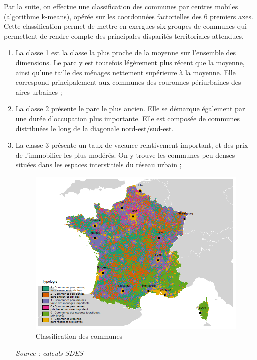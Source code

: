\documentclass[12pt, a4paper]{article}
\begin{document}
Par la suite, on effectue une classification des communes par centres mobiles (algorithme k-means), opérée sur les coordonnées factorielles des 6 premiers axes. Cette classification permet de mettre en exergues six groupes de communes qui permettent de rendre compte des principales disparités territoriales attendues. 
\begin{enumerate}
\item La classe 1 est la classe la plus proche de la moyenne sur l'ensemble des dimensions. Le parc y est toutefois légèrement plus récent que la moyenne, ainsi qu'une taille des ménages nettement supérieure à la moyenne. Elle correspond principalement aux communes des couronnes périurbaines des aires urbaines ;
\item La classe 2 présente le parc le plus ancien. Elle se démarque également par une durée d'occupation plus importante. Elle est composée de communes distribuées le long de la diagonale nord-est/sud-est.
\item La classe 3 présente un taux de vacance relativement important, et des prix de l'immobilier les plus modérés. On y trouve les communes peu denses situées dans les espaces interstitiels du réseau urbain ;

\begin{figure}[H]
\caption{Classification des communes}
\begin{center}
\includegraphics[scale=.7]{img/Typo_com.png}
\end{center}
\end{figure}
\emph{Source : calculs SDES}


\end{enumerate}
\end{document}
